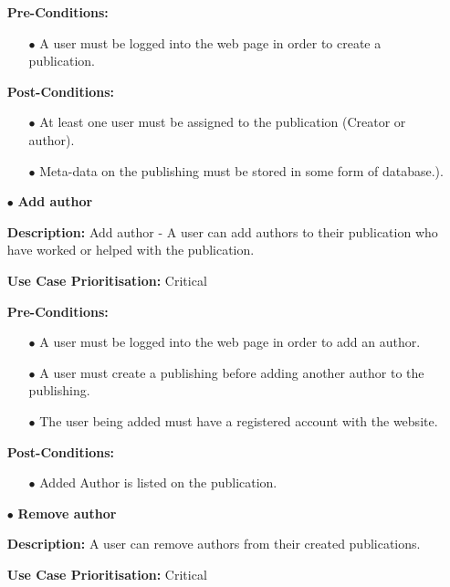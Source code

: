 \documentclass[a4paper,12pt]{article}
\begin{document}
\begin{itemize}
	\textbf{Pre-Conditions:}
	\begin{itemize}
		\item[$\bullet$]A user must be logged into the web page in order to create a publication.
		\\
	\end{itemize}
	\textbf{Post-Conditions: }
	\begin{itemize}
		\item[$\bullet$]At least one user must be assigned to the publication (Creator or author).
		\item[$\bullet$]Meta-data on the publishing must be stored in some form of database.).
		\\
	\end{itemize}
	\item[$\bullet$]\textbf{Add author}\newline

	\textbf{Description:} Add author - A user can add authors to their publication who have worked or helped with the publication.\newline
	
	\textbf{Use Case Prioritisation:} Critical\newline

	\textbf{Pre-Conditions:}
	\begin{itemize}
		\item[$\bullet$]A user must be logged into the web page in order to add an author.
		\item[$\bullet$]A user must create a publishing before adding another author to the publishing.
		\item[$\bullet$]The user being added must have a registered account with the website.
		\\
	\end{itemize}
	\textbf{Post-Conditions: }
	\begin{itemize}
		\item[$\bullet$]Added Author is listed on the publication.
		\\
	\end{itemize}
	\newpage
	\item[$\bullet$]\textbf{Remove author}\newline

	\textbf{Description:} A user can remove authors from their created publications.\newline
	
	\textbf{Use Case Prioritisation:} Critical\newline


\end{itemize}
\end{document}
